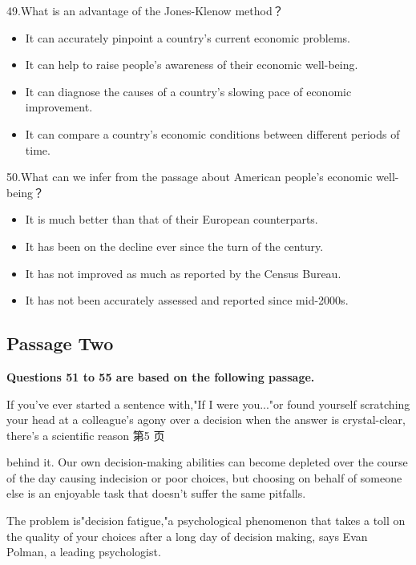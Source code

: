 \documentclass[UTF8,11pt]{ctexart}
\begin{document}
49.What is an advantage of the Jones-Klenow method？


\begin{itemize}[leftmargin=2em,itemsep=.2em,topsep=.4em]\item[A.] It can accurately pinpoint a country’s current economic problems.
\item[B.] It can help to raise people’s awareness of their economic well-being.
\item[C.] It can diagnose the causes of a country’s slowing pace of economic improvement.
\item[D.] It can compare a country’s economic conditions between different periods of time.
\end{itemize}

50.What can we infer from the passage about American people’s economic well-being？


\begin{itemize}[leftmargin=2em,itemsep=.2em,topsep=.4em]\item[A.] It is much better than that of their European counterparts.
\item[B.] It has been on the decline ever since the turn of the century.
\item[C.] It has not improved as much as reported by the Census Bureau.
\item[D.] It has not been accurately assessed and reported since mid-2000s.
\end{itemize}

\subsection*{\textbf{Passage Two}}


\textbf{Questions 51 to 55 are based on the following passage.}


If you've ever started a sentence with,"If I were you..."or found yourself scratching your head at a colleague's agony over a decision when the answer is crystal-clear, there's a scientific reason 第5 页


behind it. Our own decision-making abilities can become depleted over the course of the day causing indecision or poor choices, but choosing on behalf of someone else is an enjoyable task that doesn't suffer the same pitfalls.


The problem is"decision fatigue,"a psychological phenomenon that takes a toll on the quality of your choices after a long day of decision making, says Evan Polman, a leading psychologist.
\end{document}
